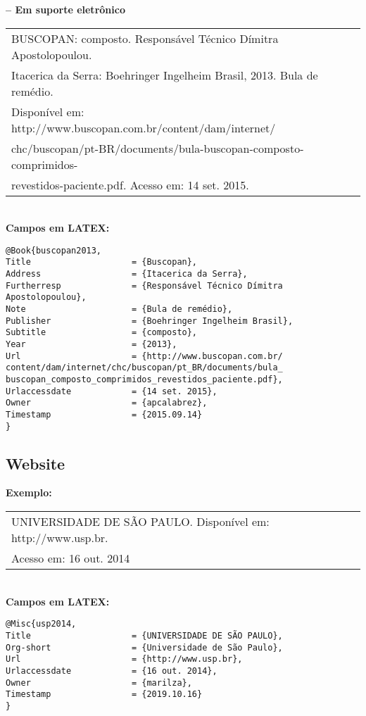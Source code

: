 \textbf{-- Em suporte eletrônico} \\

\begin{tabular}{|l|c|} \hline
	BUSCOPAN: composto. Responsável Técnico Dímitra Apostolopoulou.\\ Itacerica da Serra: Boehringer Ingelheim Brasil, 2013. Bula de remédio. \\Disponível em: http://www.buscopan.com.br/content/dam/internet/\\chc/buscopan/pt-BR/documents/bula-buscopan-composto-comprimidos-\\revestidos-paciente.pdf. Acesso em: 14 set. 2015.
	\\\hline
\end{tabular} \\

\textbf{Campos em LATEX:} 

\begin{verbatim}
@Book{buscopan2013,
Title                    = {Buscopan},
Address                  = {Itacerica da Serra},
Furtherresp              = {Responsável Técnico Dímitra 
Apostolopoulou},
Note                     = {Bula de remédio},
Publisher                = {Boehringer Ingelheim Brasil},
Subtitle                 = {composto},
Year                     = {2013},
Url                      = {http://www.buscopan.com.br/
content/dam/internet/chc/buscopan/pt_BR/documents/bula_
buscopan_composto_comprimidos_revestidos_paciente.pdf},
Urlaccessdate            = {14 set. 2015},
Owner                    = {apcalabrez},
Timestamp                = {2015.09.14}
}
\end{verbatim}

\subsection{Website}

\textbf{Exemplo:} \\

\begin{tabular}{|l|c|} \hline
	UNIVERSIDADE DE SÃO PAULO. Disponível em: http://www.usp.br.\\ Acesso em: 16 out. 2014
	\\\hline
\end{tabular} \\

\textbf{Campos em LATEX:} 

\begin{verbatim}
@Misc{usp2014,
Title                    = {UNIVERSIDADE DE SÃO PAULO},
Org-short                = {Universidade de São Paulo},
Url                      = {http://www.usp.br},
Urlaccessdate            = {16 out. 2014},
Owner                    = {marilza},
Timestamp                = {2019.10.16}
}
\end{verbatim}

